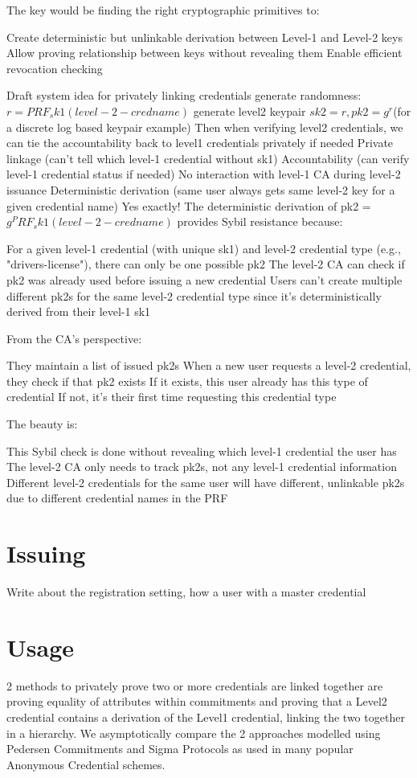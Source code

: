 The key would be finding the right cryptographic primitives to:

Create deterministic but unlinkable derivation between Level-1 and Level-2 keys
Allow proving relationship between keys without revealing them
Enable efficient revocation checking


Draft system idea for privately linking credentials
generate randomness: $r = PRF_sk1(level-2-credname)$
generate level2 keypair $sk2 = r, pk2 = g^r $(for a discrete log based keypair example)
Then when verifying level2 credentials, we can tie the accountability back to level1 credentials privately if needed
Private linkage (can't tell which level-1 credential without sk1)
Accountability (can verify level-1 credential status if needed)
No interaction with level-1 CA during level-2 issuance
Deterministic derivation (same user always gets same level-2 key for a given credential name)
Yes exactly! The deterministic derivation of pk2 = $g^PRF_sk1(level-2-credname)$ provides Sybil resistance because:

For a given level-1 credential (with unique sk1) and level-2 credential type (e.g., "drivers-license"), there can only be one possible pk2
The level-2 CA can check if pk2 was already used before issuing a new credential
Users can't create multiple different pk2s for the same level-2 credential type since it's deterministically derived from their level-1 sk1

From the CA's perspective:

They maintain a list of issued pk2s
When a new user requests a level-2 credential, they check if that pk2 exists
If it exists, this user already has this type of credential
If not, it's their first time requesting this credential type

The beauty is:

This Sybil check is done without revealing which level-1 credential the user has
The level-2 CA only needs to track pk2s, not any level-1 credential information
Different level-2 credentials for the same user will have different, unlinkable pk2s due to different credential names in the PRF

\newpage
\section{Issuing}
Write about the registration setting, how a user with a master credential 

\newpage
\section{Usage}
2 methods to privately prove two or more credentials are linked together are proving equality of attributes within commitments and proving that a Level2 credential contains a derivation of the Level1 credential, linking the two together in a hierarchy. 
We asymptotically compare the 2 approaches modelled using Pedersen Commitments and Sigma Protocols as used in many popular Anonymous Credential schemes.

